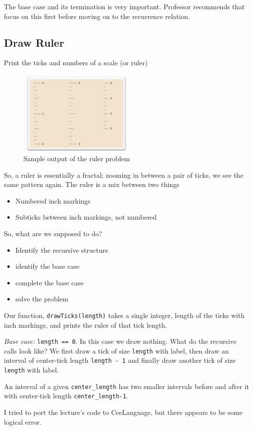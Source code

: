 \documentclass[a4paper]{article}
\newenvironment{code}{\captionsetup{type=listing}}{}
\begin{document}
The base case and its termination is very important. Professor
recommends that focus on this first before moving on to the
recurrence relation.

\subsection*{Draw Ruler}
Print the ticks and numbers of a scale (or ruler)
\begin{figure}[h]
	\centering
	\includegraphics[width=0.5\textwidth]{figures/ruler.png}
	\caption{Sample output of the ruler problem}
	\label{fig:figures-ruler-png}
\end{figure}

So, a ruler is essentially a fractal; zooming in between a pair
of ticks, we see the same pattern again. The ruler is a mix
between two things
\begin{itemize}
	\item Numbered inch markings
	\item Subticks between inch markings, not numbered
\end{itemize}

So, what are we supposed to do?
\begin{itemize}
	\item Identify the recursive structure
	\item identify the base case
	\item complete the base case
	\item solve the problem
\end{itemize}

Our function,  \texttt{drawTicks(length)} takes a single integer,
length of the ticks with inch markings, and prints the ruler of
that tick length.

\emph{Base case:}  \texttt{length == 0}. In this case we draw nothing.
What do the recursive calls look like? We first draw a tick of size
\texttt{length} with label, then draw an interval of center-tick length
\texttt{length - 1} and finally draw another tick of size
\texttt{length} with label.

An interval of a given \texttt{center\_length} has two smaller
intervals before and after it with center-tick length \texttt{center\_length-1}.

I tried to port the lecture's code to CeeLanguage, but there appears
to be some logical error. %
\begin{code}
\inputminted[samepage=false, breaklines, linenos]{c}{codes/recursion/ruler.c}
\label{ruler_c}
\caption{Recursive and helper functions for the ruler problem}
\end{code}
\end{document}

